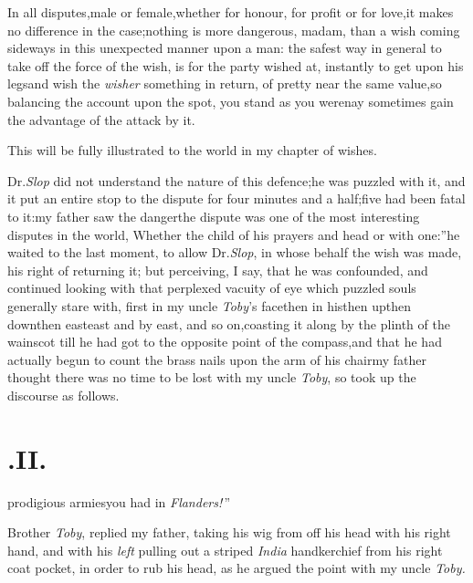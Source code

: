 \documentclass{article}
\begin{document}
In all disputes,\tsh male or female,\tsh whether for honour, for
profit or for love,\break \tsk it makes no difference in the
case;\tsk nothing is more dangerous, madam, than a wish coming
sideways in this unexpect\-ed manner upon a man: the safest way
in general to take off the force of the wish, is for the party
wished at, instantly to get upon his legs\tsk and wish the
\textit{wisher} something in return, of pretty near the same
value,\tsk so balancing the account upon the spot, you stand as
you were\tsk nay sometimes gain the advantage of the attack by
it.

This will be fully illustrated to the\break
world in my chapter of wishes.\tsh

Dr.\@ \textit{Slop} did not understand the nature of this
defence;\tsk he was puzzled with it, and it put an entire stop
to the dispute for four minutes and a half;\tsk five had been
fatal to it:\tsk my father saw the danger\tsk the dispute was
one of the most interesting disputes in the world,\break
\lqq Whether the child of his prayers and  head or with one:”\tsk he waited to
the last moment, to allow Dr.\@ \textit{Slop}, in whose behalf
the wish was made, his right of returning it; but perceiving, I
say, that he was confounded, and continued looking with that
perplexed vacuity of eye which puzzled souls generally stare
with,\break
\tsh first in my uncle \textit{Toby}’s face\tsk then
in his\tsk then up\tsk then down\tsk then 
east\tsk east and by east, and so on,\tsh coasting it along by the plinth of the
wainscot till he had got to the opposite point of the
compass,\tsh and that he had actually begun to count the brass
nails upon the arm of his chair\tsk my father thought there was
no time to be lost with my uncle \textit{Toby}, so took up the
discourse as follows.

\null
\section{.\quad  II.}

prodigious armies\break you had in \textit{Flanders!}\,”\tsh

Brother \textit{Toby}, replied my father, taking his wig from
off his head with his right hand, and with his \textit{left}
pulling out a striped \textit{India} handkerchief from his right
coat pocket, in order to rub his head, as he argued the point
with my uncle \textit{Toby.}\tsh
\end{document}
